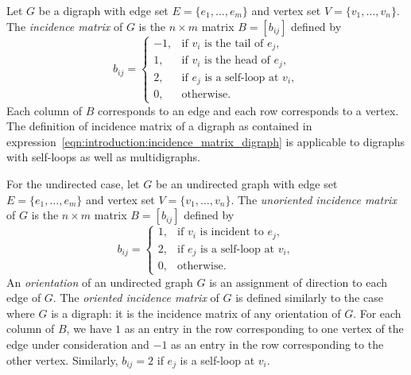 Let $G$ be a digraph with edge set $E = \{ e_1, \dots, e_m \}$ and
vertex set $V = \{ v_1, \dots, v_n \}$. The
\emph{incidence matrix} of $G$ is the
$n \times m$ matrix $B = [b_{ij}]$ defined by
\begin{equation}
\label{eqn:introduction:incidence_matrix_digraph}
b_{ij}
=
\begin{cases}
-1, & \text{if $v_i$ is the tail of $e_j$}, \\
1,  & \text{if $v_i$ is the head of $e_j$}, \\
2,  & \text{if $e_j$ is a self-loop at $v_i$}, \\
0,  & \text{otherwise}.
\end{cases}
\end{equation}
Each column of $B$ corresponds to an edge and each row corresponds to
a vertex. The definition of incidence matrix of a digraph as contained
in expression~\eqref{eqn:introduction:incidence_matrix_digraph} is
applicable to digraphs with self-loops as well as multidigraphs.

For the undirected case, let $G$ be an undirected graph with edge set
$E = \{ e_1, \dots, e_m \}$ and vertex set
$V = \{ v_1, \dots, v_n \}$. The
\emph{unoriented incidence matrix}
of $G$ is the $n \times m$ matrix $B = [b_{ij}]$ defined by
\[
b_{ij}
=
\begin{cases}
1, & \text{if $v_i$ is incident to $e_j$}, \\
2, & \text{if $e_j$ is a self-loop at $v_i$}, \\
0, & \text{otherwise}.
\end{cases}
\]
An \emph{orientation} of an undirected graph $G$ is
an assignment of direction to each edge of $G$. The
\emph{oriented incidence matrix} of
$G$ is defined similarly to the case where $G$ is a digraph: it is the
incidence matrix of any orientation of $G$. For each column of $B$, we
have $1$ as an entry in the row corresponding to one vertex of the
edge under consideration and $-1$ as an entry in the row corresponding
to the other vertex. Similarly, $b_{ij} = 2$ if $e_j$ is a self-loop
at $v_i$.

%


